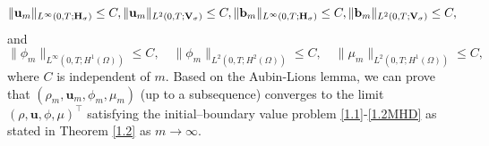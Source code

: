 \documentclass[11pt]{article}
\numberwithin{equation}{section}
\begin{document}
\begin{equation}\label{4.9}
\|\mathbf{u}_m\|_{L^{\infty}(0,T;\mathbf{H}_{\sigma})}\leq C, \|\mathbf{u}_m\|_{L^2(0,T;\mathbf{V}_{\sigma})}\leq C, \\
\|\mathbf{b}_m\|_{L^{\infty}(0,T;\mathbf{H}_{\sigma})}\leq C,  \|\mathbf{b}_m\|_{L^2(0,T;\mathbf{V}_{\sigma})}\leq C,
\end{equation}
and
\begin{equation}\label{4.10}
\|\phi_m\|_{L^{\infty}(0,T;H^1(\Omega))}\leq C, \quad \|\phi_m\|_{L^2(0,T;H^2(\Omega))}\leq C, \quad \|\mu_m\|_{L^2(0,T;H^1(\Omega))}\leq C,
\end{equation}
where $C$ is independent of $m$. Based on  the Aubin-Lions lemma,  we can  prove  that $(\rho_m,\mathbf{u}_m,\phi_m,\mu_m)$ (up to
a subsequence) converges to the limit $(\rho,\mathbf{u}, \phi,\mu)^\top$ satisfying the initial--boundary value problem \eqref{1.1}-\eqref{1.2MHD} as stated in Theorem \ref{1.2} as $m\to\infty$.
\end{document}
